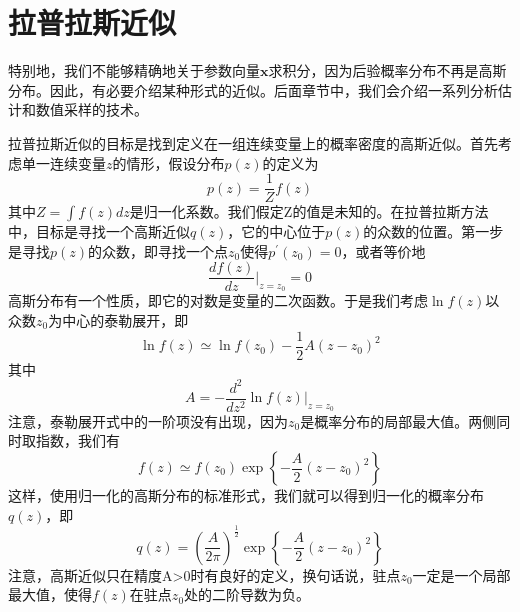 \section{拉普拉斯近似}
特别地，我们不能够精确地关于参数向量$\boldsymbol{x}$求积分，因为后验概率分布不再是高斯分布。因此，有必要介绍某种形式的近似。后面章节中，我们会介绍一系列分析估计和数值采样的技术。

拉普拉斯近似的目标是找到定义在一组连续变量上的概率密度的高斯近似。首先考虑单一连续变量$z$的情形，假设分布$p(z)$的定义为
\begin{equation}
	p(z)=\frac{1}{Z}f(z)
\end{equation}
其中$Z=\int f(z)dz$是归一化系数。我们假定Z的值是未知的。在拉普拉斯方法中，目标是寻找一个高斯近似$q(z)$，它的中心位于$p(z)$的众数的位置。第一步是寻找$p(z)$的众数，即寻找一个点$z_0$使得$p^{'}(z_0)=0$，或者等价地
\begin{equation}
	\frac{df(z)}{dz}\Bigg|_{z=z_0}=0
\end{equation}
高斯分布有一个性质，即它的对数是变量的二次函数。于是我们考虑$\ln f(z)$以众数$z_0$为中心的泰勒展开，即
\begin{equation}
	\ln f(z)\simeq \ln f(z_0) -\frac{1}{2}A(z-z_0)^2
\end{equation}
其中
\begin{equation}
	A=-\frac{d^2}{dz^2}\ln f(z)\Bigg|_{z=z_0}
\end{equation}
注意，泰勒展开式中的一阶项没有出现，因为$z_0$是概率分布的局部最大值。两侧同时取指数，我们有
\begin{equation}
\label{4135}
	f(z)\simeq f(z_0)\exp\left\{-\frac{A}{2}(z-z_0)^2 \right\}
\end{equation}
这样，使用归一化的高斯分布的标准形式，我们就可以得到归一化的概率分布$q(z)$，即
\begin{equation}
	q(z)=\left(\frac{A}{2\pi} \right)^{\frac{1}{2}}\exp\left\{-\frac{A}{2}(z-z_0)^2 \right\}
\end{equation}
注意，高斯近似只在精度A>0时有良好的定义，换句话说，驻点$z_0$一定是一个局部最大值，使得$f(z)$在驻点$z_0$处的二阶导数为负。

